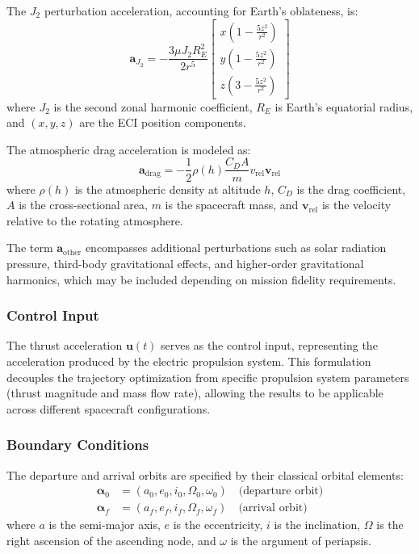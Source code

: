 \documentclass[a4paper,fleqn]{cas-dc}
\begin{document}
The $J_2$ perturbation acceleration, accounting for Earth's oblateness, is:
\begin{equation}
\mathbf{a}_{J_2} = -\frac{3\mu J_2 R_E^2}{2r^5} \begin{bmatrix}
x\left(1 - \frac{5z^2}{r^2}\right) \\[4pt]
y\left(1 - \frac{5z^2}{r^2}\right) \\[4pt]
z\left(3 - \frac{5z^2}{r^2}\right)
\end{bmatrix}
\end{equation}
where $J_2$ is the second zonal harmonic coefficient, $R_E$ is Earth's equatorial radius, and $(x, y, z)$ are the ECI position components.

The atmospheric drag acceleration is modeled as:
\begin{equation}
\mathbf{a}_{\text{drag}} = -\frac{1}{2}\rho(h) \frac{C_D A}{m} v_{\text{rel}} \mathbf{v}_{\text{rel}}
\end{equation}
where $\rho(h)$ is the atmospheric density at altitude $h$, $C_D$ is the drag coefficient, $A$ is the cross-sectional area, $m$ is the spacecraft mass, and $\mathbf{v}_{\text{rel}}$ is the velocity relative to the rotating atmosphere.

The term $\mathbf{a}_{\text{other}}$ encompasses additional perturbations such as solar radiation pressure, third-body gravitational effects, and higher-order gravitational harmonics, which may be included depending on mission fidelity requirements.

\subsubsection{Control Input}

The thrust acceleration $\mathbf{u}(t)$ serves as the control input, representing the acceleration produced by the electric propulsion system. This formulation decouples the trajectory optimization from specific propulsion system parameters (thrust magnitude and mass flow rate), allowing the results to be applicable across different spacecraft configurations.

\subsubsection{Boundary Conditions}

The departure and arrival orbits are specified by their classical orbital elements:
\begin{align}
\boldsymbol{\alpha}_0 &= (a_0, e_0, i_0, \Omega_0, \omega_0) \quad \text{(departure orbit)} \\
\boldsymbol{\alpha}_f &= (a_f, e_f, i_f, \Omega_f, \omega_f) \quad \text{(arrival orbit)}
\end{align}
where $a$ is the semi-major axis, $e$ is the eccentricity, $i$ is the inclination, $\Omega$ is the right ascension of the ascending node, and $\omega$ is the argument of periapsis.
\end{document}
